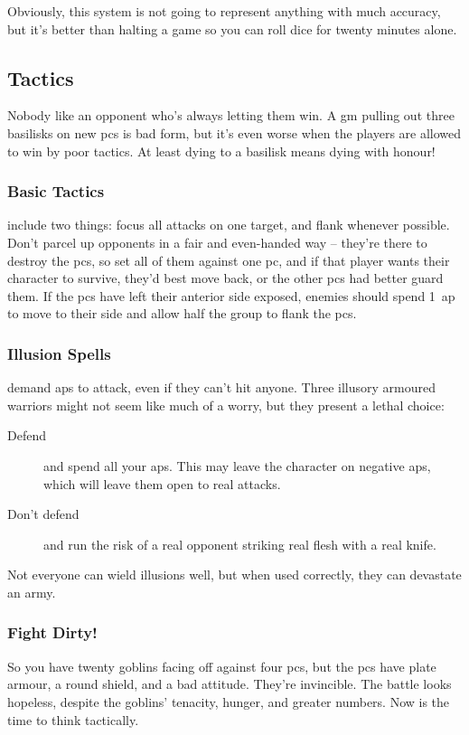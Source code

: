 \begin{multicols}{2}
Obviously, this system is not going to represent anything with much accuracy, but it's better than halting a game so you can roll dice for twenty minutes alone.

\subsection{Tactics}

Nobody like an opponent who's always letting them win.
A \gls{gm} pulling out three \glspl{basilisk} on new \glspl{pc} is bad form, but it's even worse when the players are allowed to win by poor tactics.
At least dying to a basilisk means dying with honour!

\subsubsection{Basic Tactics}
include two things: focus all attacks on one target, and flank whenever possible.
Don't parcel up opponents in a fair and even-handed way -- they're there to destroy the \glspl{pc}, so set all of them against one \gls{pc}, and if that player wants their character to survive, they'd best move back, or the other \glspl{pc} had better guard them.%
If the \glspl{pc} have left their anterior side exposed, enemies should spend 1~\gls{ap} to move to their side and allow half the group to flank the \glspl{pc}.

\subsubsection{Illusion Spells}
demand \glspl{ap} to attack, even if they can't hit anyone.
Three illusory armoured warriors might not seem like much of a worry, but they present a lethal choice:

\begin{description}
  \item[Defend]
  and spend all your \glspl{ap}.
  This may leave the character on negative \glspl{ap}, which will leave them open to real attacks.
  \item[Don't defend]
  and run the risk of a real opponent striking real flesh with a real knife. 
\end{description}

Not everyone can wield illusions well, but when used correctly, they can devastate an army.

\subsubsection{Fight Dirty!}
So you have twenty goblins facing off against four \glspl{pc}, but the \glspl{pc} have plate armour, a round shield, and a bad attitude.
They're invincible.
The battle looks hopeless, despite the goblins' tenacity, hunger, and greater numbers.
Now is the time to think tactically.


\end{multicols}
